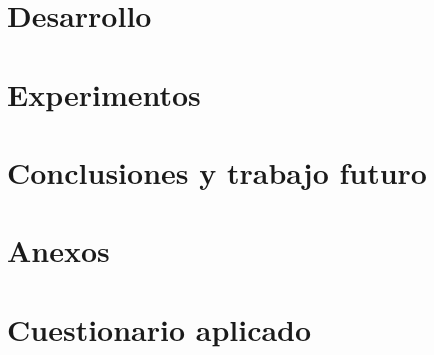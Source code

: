 \chapter{Desarrollo}

\chapter{Experimentos}

\chapter{Conclusiones y trabajo futuro}

\appendix
\chapter*{Anexos}

\chapter{Cuestionario aplicado}
